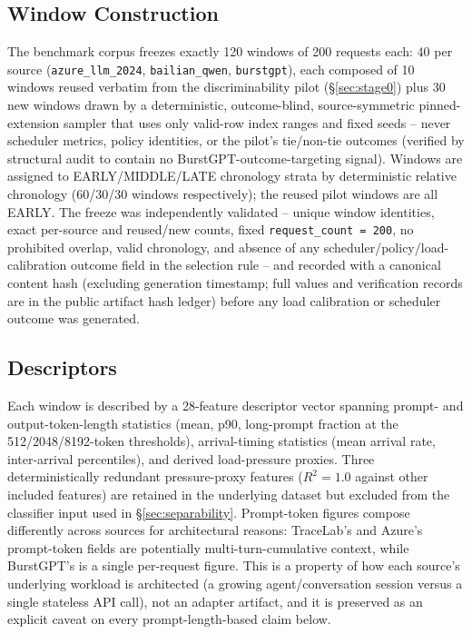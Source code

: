 \subsection{Window Construction}
\label{sec:windows}

The benchmark corpus freezes exactly 120 windows of 200 requests each: 40
per source (\texttt{azure\_llm\_2024}, \texttt{bailian\_qwen},
\texttt{burstgpt}), each composed of 10 windows reused verbatim from the
discriminability pilot (\S\ref{sec:stage0}) plus 30 new windows drawn by a
deterministic, outcome-blind, source-symmetric pinned-extension sampler
that uses only valid-row index ranges and fixed seeds -- never scheduler
metrics, policy identities, or the pilot's tie/non-tie outcomes (verified
by structural audit to contain no BurstGPT-outcome-targeting signal).
Windows are assigned to EARLY/MIDDLE/LATE chronology strata by
deterministic relative chronology (60/30/30 windows respectively); the
reused pilot windows are all EARLY. The freeze was independently
validated -- unique window identities, exact per-source and reused/new
counts, fixed \texttt{request\_count = 200}, no prohibited overlap, valid
chronology, and absence of any scheduler/policy/load-calibration outcome
field in the selection rule -- and recorded with a canonical content hash
(excluding generation timestamp; full values and verification records are
in the public artifact hash ledger) before any load calibration or
scheduler outcome was generated.

\subsection{Descriptors}
\label{sec:descriptors}

Each window is described by a 28-feature descriptor vector spanning prompt-
and output-token-length statistics (mean, p90, long-prompt fraction at the
512/2048/8192-token thresholds), arrival-timing statistics (mean arrival
rate, inter-arrival percentiles), and derived load-pressure proxies. Three
deterministically redundant pressure-proxy features ($R^2=1.0$ against
other included features) are retained in the underlying dataset but
excluded from the classifier input used in \S\ref{sec:separability}.
Prompt-token figures compose differently across sources for architectural
reasons: TraceLab's and Azure's prompt-token fields are potentially
multi-turn-cumulative context, while BurstGPT's is a single per-request
figure. This is a property of how each source's underlying workload is
architected (a growing agent/conversation session versus a single stateless
API call), not an adapter artifact, and it is preserved as an explicit
caveat on every prompt-length-based claim below.


